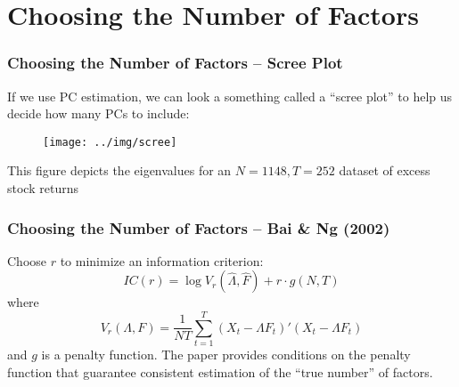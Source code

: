 \section{Choosing the Number of Factors}
\begin{frame}[c]\frametitle{Choosing the Number of Factors -- Scree Plot}
    
If we use PC estimation, we can look a something called a ``scree plot'' to help us decide how many PCs to include:
\begin{figure}
	\centering
	\texttt{[image: ../img/scree]}
\end{figure}
This figure depicts the eigenvalues for an $N=1148, T = 252$ dataset of excess stock returns
\end{frame}
\begin{frame}
	\frametitle{Choosing the Number of Factors -- Bai \& Ng (2002)}

Choose $r$ to minimize an information criterion:
$$IC(r) = \log V_r(\widehat{\Lambda}, \widehat{F}) + r \cdot g(N,T)$$
where
	$$V_r(\Lambda, F) = \frac{1}{NT}\sum_{t=1}^T (X_t - \Lambda F_t)'(X_t - \Lambda F_t)$$
and $g$ is a penalty function. The paper provides conditions on the penalty function that guarantee consistent estimation of the ``true number'' of factors. 
\end{frame}
%
%
%
%
